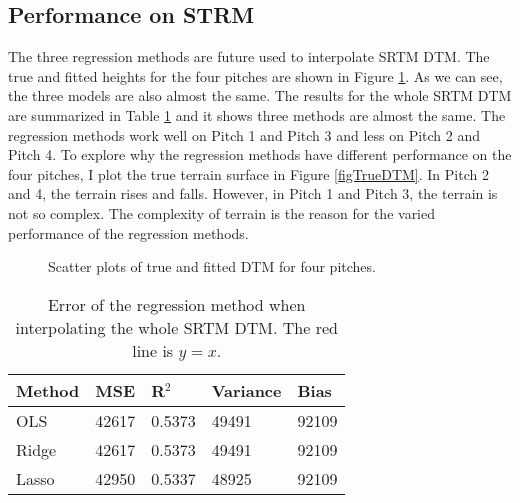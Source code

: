 \documentclass[a4paper]{article}
\begin{document}
\subsection{Performance on STRM}
The three regression methods are future used to interpolate SRTM DTM. The true and fitted heights for the four pitches are shown in Figure \ref{figPitches}. As we can see, the three models are also almost the same. The results for the whole SRTM DTM are summarized in Table \ref{tabWhole} and it shows three methods are almost the same.
\newline\newline
The regression methods work well on Pitch 1 and Pitch 3 and less on Pitch 2 and Pitch 4. To explore why the regression methods have different performance on the four pitches, I plot the true terrain surface in Figure  \ref{figTrueDTM}. In Pitch 2 and 4, the terrain rises and falls. However, in Pitch 1 and Pitch 3, the terrain is not so complex. The complexity of terrain is the reason for the varied performance of the regression methods.
\begin{figure}[htbp]
    \centering
\newline
\newline 
\newline
    \caption{Scatter plots of true and fitted DTM for four pitches.}
    \label{figPitches}
\end{figure}

\begin{table}[htb]
\centering
\caption{Error of the regression method when interpolating the whole SRTM DTM. The red line is $y = x$.}
\label{tabWhole}
\begin{tabular}{lllll}
\hline
Method & MSE        & R$^{2} $    & Variance    & Bias       \\
\hline
OLS    & 42617 & 0.5373     & 49491 & 92109            \\
Ridge  & 42617 & 0.5373     & 49491 & 92109            \\
Lasso  & 42950 & 0.5337     & 48925 & 92109       \\
\hline
\end{tabular}
\end{table}
\end{document}
